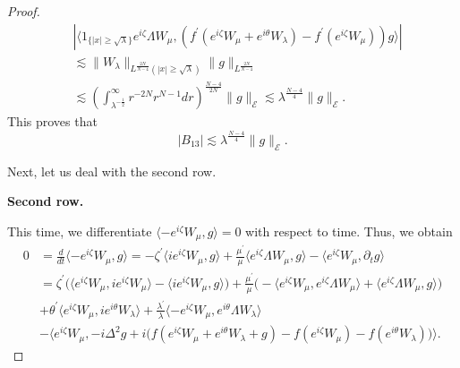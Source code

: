 \documentclass[a4paper,two-side,10pt]{amsart}
\numberwithin{equation}{section}
\begin{document}
\begin{proof}
\begin{align*}
& |\langle  1_{\{|x|\geq  \sqrt{\lambda}\}} e^{i\zeta} \Lambda W_\mu ,  (f^\prime (e^{i\zeta} W_\mu +e^{i\theta} W_\lambda ) - f^\prime (e^{i\zeta} W_\mu ))g \rangle |\\
&\lesssim   \|W_\lambda \|_{L^{\frac{2N}{N-4}}(|x|\geq  \sqrt{\lambda})}  \|g\|_{L^{\frac{2N}{N-4}}}\\
&\lesssim (\int_{\lambda^{-\frac{1}{2}} }^\infty r^{-2N} r^{N-1} dr)^{\frac{N-4}{2N}}  \|g\|_{\mathcal{E}} \lesssim \lambda^{\frac{N-4}{4}}  \|g\|_{\mathcal{E}}  .
\end{align*}
This proves that
$$|B_{13}|\lesssim \lambda^{\frac{N-4}{4}} \|g\|_{\mathcal{E}} .$$


Next, let us deal with the second row. 

{\bf Second row.}

This time, we differentiate $\langle -e^{i\zeta}  W_\mu ,g\rangle =0$ with respect to time. Thus, we obtain
\begin{align*}
0&= \frac{d}{dt} \langle -e^{i\zeta} W_\mu ,g\rangle = - \zeta^\prime \langle i e^{i\zeta}  W_\mu ,g \rangle + \frac{\mu^\prime}{\mu} \langle e^{i\zeta}  \Lambda W_\mu ,g \rangle - \langle e^{i\zeta}  W_\mu ,\partial_t g \rangle \\
&= \zeta^\prime \big( \langle  e^{i\zeta}  W_\mu , i e^{i\zeta} W_\mu \rangle - \langle i e^{i\zeta}  W_\mu ,g \rangle\big) +\frac{\mu^\prime}{\mu} \big(-\langle   e^{i\zeta}  W_\mu , e^{i\zeta} \Lambda W_\mu\rangle + \langle  e^{i\zeta}  \Lambda W_\mu ,g \rangle\big)\\
&+\theta^\prime \langle e^{i\zeta}  W_\mu ,i e^{i\theta} W_\lambda \rangle +\frac{\lambda^\prime}{\lambda} \langle -e^{i\zeta}  W_\mu , e^{i\theta} \Lambda W_\lambda \rangle \\
&- \big\langle  e^{i\zeta}  W_\mu , -i \Delta^2 g +i \big(f(e^{i\zeta} W_\mu +e^{i\theta} W_\lambda +g) - f(e^{i\zeta} W_\mu) - f(e^{i\theta} W_\lambda)\big) \big\rangle .
\end{align*}


\end{proof}
\end{document}

